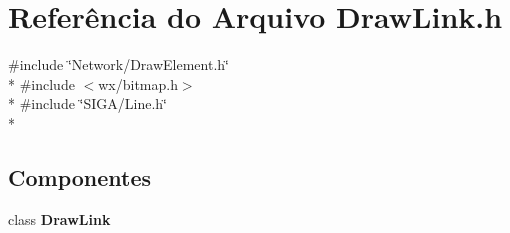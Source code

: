 \section{Referência do Arquivo Draw\+Link.\+h}
\label{_draw_link_8h}
{\ttfamily \#include \char`\"{}Network/\+Draw\+Element.\+h\char`\"{}}\\*
{\ttfamily \#include $<$wx/bitmap.\+h$>$}\\*
{\ttfamily \#include \char`\"{}S\+I\+G\+A/\+Line.\+h\char`\"{}}\\*
\subsection*{Componentes}
\begin{DoxyCompactItemize}
\item 
class {\bf Draw\+Link}
\end{DoxyCompactItemize}
